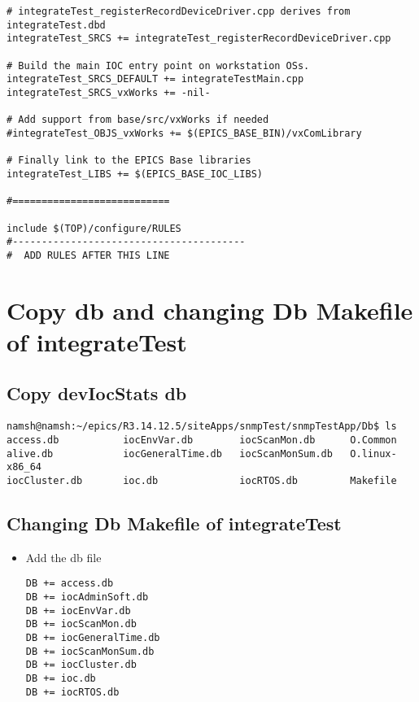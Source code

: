 \documentclass[11pt
  , a4paper
  , article
  , oneside
]{memoir}
\begin{document}
\begin{lstlisting}[style=termstyle]
# integrateTest_registerRecordDeviceDriver.cpp derives from integrateTest.dbd
integrateTest_SRCS += integrateTest_registerRecordDeviceDriver.cpp

# Build the main IOC entry point on workstation OSs.
integrateTest_SRCS_DEFAULT += integrateTestMain.cpp
integrateTest_SRCS_vxWorks += -nil-

# Add support from base/src/vxWorks if needed
#integrateTest_OBJS_vxWorks += $(EPICS_BASE_BIN)/vxComLibrary

# Finally link to the EPICS Base libraries
integrateTest_LIBS += $(EPICS_BASE_IOC_LIBS)

#===========================

include $(TOP)/configure/RULES
#----------------------------------------
#  ADD RULES AFTER THIS LINE
\end{lstlisting}
\section{Copy db and changing Db Makefile of integrateTest}
\subsection{Copy devIocStats db}
\begin{lstlisting}[style=termstyle]
namsh@namsh:~/epics/R3.14.12.5/siteApps/snmpTest/snmpTestApp/Db$ ls
access.db           iocEnvVar.db        iocScanMon.db      O.Common
alive.db            iocGeneralTime.db   iocScanMonSum.db   O.linux-x86_64     
iocCluster.db       ioc.db              iocRTOS.db         Makefile           
\end{lstlisting}
\subsection{Changing Db Makefile of integrateTest}
\begin{itemize}
	\item Add the db file
	\begin{lstlisting}[style=termstyle]
DB += access.db 
DB += iocAdminSoft.db
DB += iocEnvVar.db
DB += iocScanMon.db
DB += iocGeneralTime.db
DB += iocScanMonSum.db
DB += iocCluster.db
DB += ioc.db
DB += iocRTOS.db 
\end{lstlisting}
\end{itemize}
\end{document}
